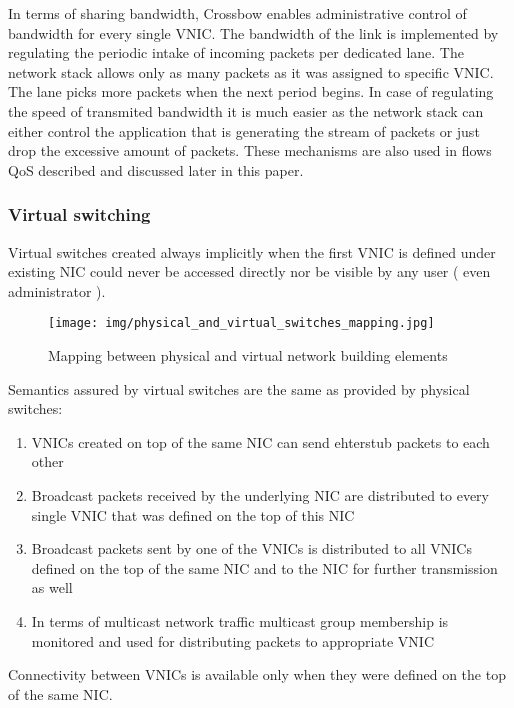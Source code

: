 \documentclass[11pt]{book}
\begin{document}
			In terms of sharing bandwidth, Crossbow enables administrative control of bandwidth for every single VNIC. The bandwidth of the link
			is implemented by regulating the periodic intake of incoming packets per dedicated lane. The network stack allows only as many packets as it was 
			assigned to specific VNIC. The lane picks more packets when the next period begins. In case of regulating the speed of transmited bandwidth it is much
			easier as the network stack can either control the application that is generating the stream of packets or just drop the excessive amount of packets.
			These mechanisms are also used in flows QoS described and discussed later in this paper.

			\subsubsection{Virtual switching}
			
			Virtual switches created always implicitly when the first VNIC is defined under existing NIC could never be accessed directly nor be visible by
			any user ( even administrator ). 
			
			\begin{figure}[H]
				\texttt{[image: img/physical\_and\_virtual\_switches\_mapping.jpg]}
				\caption{Mapping between physical and virtual network building elements}
			\end{figure}
			
			Semantics assured by virtual switches are the same as provided by physical switches: 
			\begin{enumerate}
				\item{VNICs created on top of the same NIC can send ehterstub packets to each other}
				\item{Broadcast packets received by the underlying NIC are distributed to every single VNIC that was defined on the top of this NIC}
				\item{Broadcast packets sent by one of the VNICs is distributed to all VNICs defined on the top of the same NIC and to the NIC for further transmission as well}
				\item{In terms of multicast network traffic multicast group membership is monitored and used for distributing packets to appropriate VNIC}
			\end{enumerate}

			Connectivity between VNICs is available only when they were defined on the top of the same NIC. 
\end{document}
